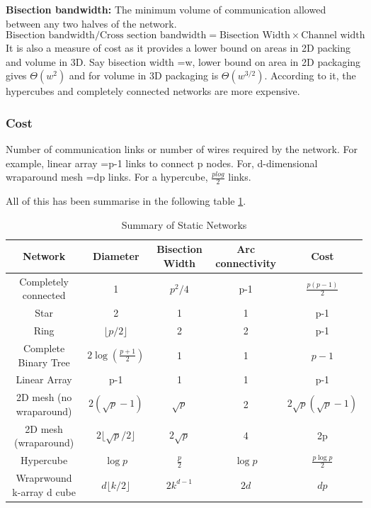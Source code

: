 \documentclass[12pt]{article}
\begin{document}
\textbf{Bisection bandwidth: }The minimum volume of communication allowed between any two halves of the network.
\begin{equation}
    \text{Bisection bandwidth/Cross section bandwidth} = \text{Bisection Width} \times \text{Channel width}
\end{equation}
It is also a measure of cost as it provides a lower bound on areas in 2D packing and volume in 3D.
Say bisection width =w, lower bound on area in 2D packaging gives $\Theta(w^2)$ and for volume in 3D packaging is $\Theta(w^{3/2})$.
According to it, the hypercubes and completely connected networks are more expensive.

\subsubsection{Cost}
Number of communication links or number of wires required by the network.
For example, linear array =p-1 links to connect p nodes. For, d-dimensional wraparound mesh =dp links.
For a hypercube, $\frac{plog}{2}$ links. 

All of this has been summarise in the following table \ref{tab:static_network}. 
\begin{table}[H]
    \centering
    \begin{tabular}{|c|c|c|c|c|}
        \hline
        Network & Diameter & Bisection Width & Arc connectivity & Cost  \\
        \hline
        Completely connected & 1 & $p^2/4$ & p-1 & $\frac{p(p-1)}{2}$ \\
        Star & 2 & 1 & 1 & p-1 \\
        Ring & $\lfloor p/2 \rfloor$ & 2 & 2 & p-1 \\
        Complete Binary Tree & $2\log(\frac{p+1}{2})$ & 1 & 1 & $p-1$ \\
        Linear Array & p-1 & 1 & 1 & p-1 \\
        2D mesh (no wraparound) & $2(\sqrt{p}-1)$ & $\sqrt{p}$ & 2 & $2\sqrt{p}(\sqrt{p}-1)$ \\
        2D mesh (wraparound) & $2\lfloor\sqrt{p}/2\rfloor$ & $2\sqrt{p}$ & 4 & 2p \\
        Hypercube & $\log p$ & $\frac{p}{2}$ & $\log p$ & $\frac{p \log p}{2}$ \\
        Wraprwound k-array d cube & $d \lfloor k/2\rfloor$ & $2k^{d-1}$ & $2d$ & $dp$ \\ 
        \hline
    \end{tabular}
    \caption{Summary of Static Networks}
    \label{tab:static_network}
\end{table}
\end{document}
